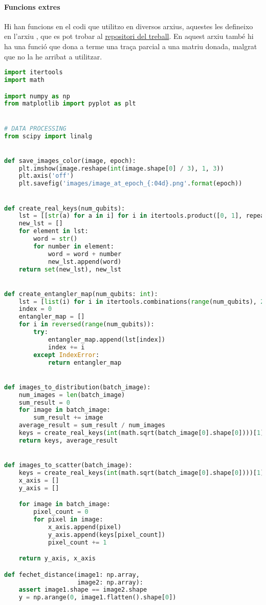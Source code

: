 \paragraph{Funcions extres}
Hi han funcions en el codi que utilitzo en diversos arxius, aquestes les defineixo en l'arxiu , que es pot trobar al \href{https://github.com/tomiock/qGAN}{repositori del treball}. En aquest arxiu també hi ha una funció que dona a terme una traça parcial a una matriu donada, malgrat que no la he arribat a utilitzar. 
\begin{lstlisting}[language=Python, caption=Funcions varies]
import itertools
import math

import numpy as np
from matplotlib import pyplot as plt


# DATA PROCESSING
from scipy import linalg


def save_images_color(image, epoch):
	plt.imshow(image.reshape(int(image.shape[0] / 3), 1, 3))
	plt.axis('off')
	plt.savefig('images/image_at_epoch_{:04d}.png'.format(epoch))


def create_real_keys(num_qubits):
	lst = [[str(a) for a in i] for i in itertools.product([0, 1], repeat=num_qubits)]
	new_lst = []
	for element in lst:
		word = str()
		for number in element:
			word = word + number
			new_lst.append(word)
	return set(new_lst), new_lst


def create_entangler_map(num_qubits: int):
	lst = [list(i) for i in itertools.combinations(range(num_qubits), 2)]
	index = 0
	entangler_map = []
	for i in reversed(range(num_qubits)):
		try:
			entangler_map.append(lst[index])
			index += i
		except IndexError:
			return entangler_map


def images_to_distribution(batch_image):
	num_images = len(batch_image)
	sum_result = 0
	for image in batch_image:
		sum_result += image
	average_result = sum_result / num_images
	keys = create_real_keys(int(math.sqrt(batch_image[0].shape[0])))[1]
	return keys, average_result


def images_to_scatter(batch_image):
	keys = create_real_keys(int(math.sqrt(batch_image[0].shape[0])))[1]
	x_axis = []
	y_axis = []

	for image in batch_image:
		pixel_count = 0
		for pixel in image:
			x_axis.append(pixel)
			y_axis.append(keys[pixel_count])
			pixel_count += 1

	return y_axis, x_axis

def fechet_distance(image1: np.array, 
					image2: np.array):
	assert image1.shape == image2.shape
	y = np.arange(0, image1.flatten().shape[0])


\end{lstlisting}
